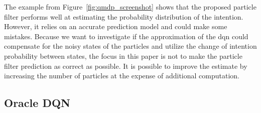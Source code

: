 The example from Figure~\ref{fig:qmdp_screenshot} shows that the proposed particle filter performs well at estimating the probability distribution of the intention. However, it relies on an accurate prediction model and could make some mistakes. 
Because we want to investigate if the approximation of the \gls{dqn} could compensate for the noisy states of the particles and utilize the change of intention probability between states, the focus in this paper is not to make the particle filter prediction as correct as possible. 
It is possible to improve the estimate by increasing the number of particles at the expense of additional computation. 

\subsection{Oracle DQN}
